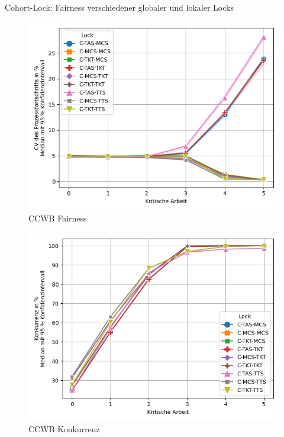 \documentclass[fleqn,compress,utf8,aspectratio=169,t]{beamer}
\begin{document}
\begin{frame}{Cohort-Lock: Fairness verschiedener globaler und lokaler Locks}
    \begin{minipage}{.49\textwidth}
        \begin{figure}
            \includegraphics[width=\textwidth]{../../Dokumentation/Latex/Bilder/benchmarks/intelmpi/cohort-mcs-spin-tkt/CCWB-processes=112-fairness}
            \caption{CCWB Fairness}
        \end{figure}
    \end{minipage}
    \begin{minipage}{.49\textwidth}
        \begin{figure}
            \includegraphics[width=\textwidth]{../../Dokumentation/Latex/Bilder/benchmarks/intelmpi/cohort-mcs-spin-tkt/CCWB-processes=112-contention}
            \caption{CCWB Konkurrenz}
        \end{figure}
    \end{minipage}
\end{frame}
\end{document}
